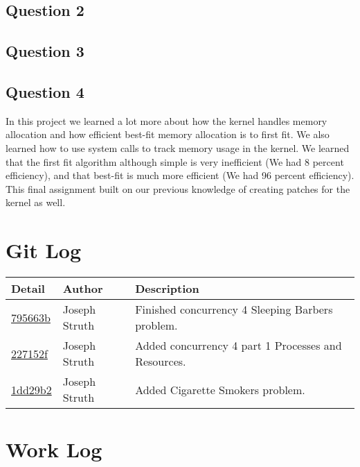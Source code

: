 \documentclass[10pt,draftclsnofoot,onecolumn, compsoc]{IEEEtran}
\begin{document}
\subsection{Question 2}


\subsection{Question 3}

\subsection{Question 4}
In this project we learned a lot more about how the kernel handles memory allocation and how efficient best-fit memory allocation is to first fit. We also learned how to use system calls to track memory usage in the kernel. We learned that the first fit algorithm although simple is very inefficient (We had 8 percent efficiency), and that best-fit is much more efficient (We had 96 percent efficiency). This final assignment built on our previous knowledge of creating patches for the kernel as well.
\section{Git Log}

\begin{tabular}{| l | l | p{15cm} |}\textbf{Detail} & \textbf{Author} & \textbf{Description}\\\hline
\href{https://github.com/struthj/CS444/commit/795663bbc8dc4a8ce82794b8a32bfa0afd103d10}{795663b} & Joseph Struth & Finished concurrency 4 Sleeping Barbers problem.\\\hline
\href{https://github.com/struthj/CS444/commit/227152f32c8c770360b7d7a09730de14bc33640f}{227152f} & Joseph Struth & Added concurrency 4 part 1 Processes and Resources.\\\hline
\href{https://github.com/struthj/CS444/commit/1dd29b2a4a7a1dbf126197f7426facef99ece345}{1dd29b2} & Joseph Struth & Added Cigarette Smokers problem.\\\hline
\end{tabular}

\section{Work Log}
\end{document}
